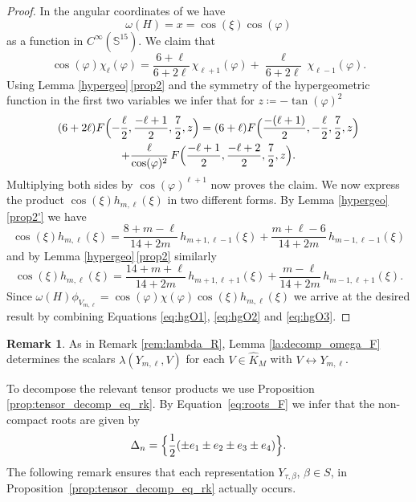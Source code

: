 \documentclass[JEP,XML,SOM,NoFloatCountersInSection,Unicode,published]{cedram}
\theoremstyle{definition}
\newtheorem{remark}[theorem]{Remark}
\newcommand{\lra}{\ensuremath{\leftrightarrow}}
\newcommand{\Bhyp}[4]{\ensuremath{F\Bigl(#1,#2,#3,#4\Bigr)}}
\newcommand{\mb}[1]{\ensuremath{\mathbb{#1}}}
\begin{document}
\begin{proof}
In the angular coordinates of \cite[p.\,275]{JW2} we have
\[
\omega(H)=x=\cos(\xi)\cos(\varphi)
\]
as a function in $C^\infty(\mb S^{15})$. We claim that
\begin{equation}
\label{eq:hgO1}\cos(\varphi)\chi_\ell(\varphi)=\frac{6+\ell}{6+2\ell}\,\chi_{\ell+1}(\varphi)+\frac{\ell}{6+2\ell}\,\chi_{\ell-1}(\varphi).
\end{equation}
Using Lemma \ref{hypergeo}\,\eqref{prop2} and the symmetry of the hypergeometric function in the first two variables we infer that for $z\coloneqq-\tan(\varphi)^2$
\begin{multline*}
(6+2\ell)\Bhyp{-\frac{\ell}{2}}{\frac{-\ell+1}{2}}{\frac72}{z}=(6+\ell)\Bhyp{\frac{-(\ell+1)}{2}}{-\frac{\ell}{2}}{\frac72}{z}\\
+\frac{\ell}{\cos(\varphi)^2}\,\Bhyp{\frac{-\ell+1}{2}}{\frac{-\ell+2}{2}}{\frac72}{z}.
\end{multline*}
Multiplying both sides by $\cos(\varphi)^{\ell+1}$ now proves the claim.
We now express the product $\cos(\xi)h_{m,\ell}(\xi)$ in two different forms. By Lemma \ref{hypergeo}\,\eqref{prop2'} we have
\begin{equation}
\label{eq:hgO2}\cos(\xi)h_{m,\ell}(\xi)=\frac{8+m-\ell}{14+2m}\,h_{m+1,\ell-1}(\xi)+\frac{m+\ell-6}{14+2m}\,h_{m-1,\ell-1}(\xi)
\end{equation}
and by Lemma \ref{hypergeo}\,\eqref{prop2} similarly
\begin{equation}
\label{eq:hgO3}\cos(\xi)h_{m,\ell}(\xi)=\frac{14+m+\ell}{14+2m}\,h_{m+1,\ell+1}(\xi)+\frac{m-\ell}{14+2m}\,h_{m-1,\ell+1}(\xi).
\end{equation}
Since $\omega(H)\phi_{V_{m,\ell}}=\cos(\varphi)\chi(\varphi)\cos(\xi)h_{m,\ell}(\xi)$ we arrive at the desired result by combining Equations \eqref{eq:hgO1}, \eqref{eq:hgO2} and \eqref{eq:hgO3}.
\end{proof}

\begin{remark}\label{rem:lambda_F}
As in Remark \ref{rem:lambda_R}, Lemma \ref{la:decomp_omega_F} determines the scalars $\lambda(Y_{m,\ell},V)$ for each $V\in\hat K_M$ with $V\lra Y_{m,\ell}$.
\end{remark}

To decompose the relevant tensor products we use Proposition \ref{prop:tensor_decomp_eq_rk}. By Equation~\eqref{eq:roots_F} we infer that the non-compact roots are given by
\[
\Delta_n=\Bigl\{\frac{1}{2}(\pm e_1\pm e_2\pm e_3\pm e_4)\Bigr\}.
\]
The following remark ensures that each representation $Y_{\tau,\beta}$, $\beta\in S$, in Proposition~\ref{prop:tensor_decomp_eq_rk} actually occurs.
\end{document}
